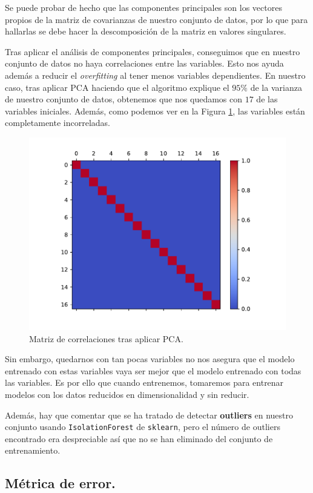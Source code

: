 \documentclass[a4paper, 20pt]{article}
\begin{document}
Se puede probar de hecho que las componentes principales son los vectores propios de la matriz de covarianzas de nuestro conjunto de datos, por lo que para hallarlas se debe hacer la descomposición de la matriz en valores singulares.

Tras aplicar el análisis de componentes principales, conseguimos que en nuestro conjunto de datos no haya correlaciones entre las variables. Esto nos ayuda además a reducir el \emph{overfitting} al tener menos variables dependientes. En nuestro caso, tras aplicar PCA haciendo que el algoritmo explique el $95\%$ de la varianza de nuestro conjunto de datos, obtenemos que nos quedamos con $17$ de las variables iniciales. Además, como podemos ver en la Figura \ref{fig:corr-pca}, las variables están completamente incorreladas.

\begin{figure}[H]
  \centering
  \includegraphics[width=0.55\linewidth]{media/corr-pca.pdf}
  \caption{Matriz de correlaciones tras aplicar PCA. }
  \label{fig:corr-pca}
\end{figure}


Sin embargo, quedarnos con tan pocas variables no nos asegura que el modelo entrenado con estas variables vaya ser mejor que el modelo entrenado con todas las variables.  Es por ello que cuando entrenemos, tomaremos para entrenar modelos con los datos reducidos en dimensionalidad y sin reducir.

Además, hay que comentar que se ha tratado de detectar \textbf{outliers} en nuestro conjunto usando \lstinline{IsolationForest} de \lstinline{sklearn}, pero el número de outliers encontrado era despreciable así que no se han eliminado del conjunto de entrenamiento.



\subsection{Métrica de error.}
\end{document}
